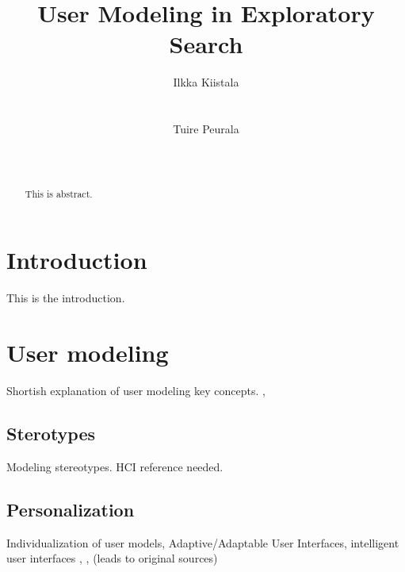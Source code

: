 \documentclass{sigchi}
\begin{document}
\title{User Modeling in Exploratory Search}

\author{
  \alignauthor Ilkka Kiistala\\
    \\
    \\
  \alignauthor Tuire Peurala\\
    \\
    \\
}

\maketitle

\begin{abstract}
This is abstract.
\end{abstract}





\section{Introduction}
This is the introduction.


\section{User modeling}
Shortish explanation of user modeling key concepts. 
\cite{rich99}, \cite{fischer01}

\subsection{Sterotypes}
Modeling  stereotypes. 
HCI reference needed.
\cite{dillon96}

\subsection{Personalization}
Individualization of user models, Adaptive/Adaptable User Interfaces, intelligent user interfaces
\cite{bunt04}, \cite{findlater04}, \cite{van08} (leads to original sources)
\end{document}
